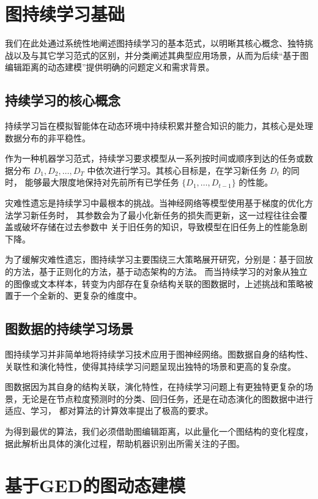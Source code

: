 \chapter{图持续学习基础}
我们在此处通过系统性地阐述图持续学习的基本范式，以明晰其核心概念、独特挑战以及与其它学习范式的区别，并分类阐述其典型应用场景，从而为后续“基于图编辑距离的动态建模”提供明确的问题定义和需求背景。

\section{持续学习的核心概念}

持续学习旨在模拟智能体在动态环境中持续积累并整合知识的能力，其核心是处理数据分布的非平稳性。

作为一种机器学习范式，持续学习要求模型从一系列按时间或顺序到达的任务或数据分布
$D_1,D_2,\dots,D_T$ 中依次进行学习。其核心目标是，在学习新任务 $D_t$ 的同时，
能够最大限度地保持对先前所有已学任务 $\{D_1,\dots,D_{t-1}\}$ 的性能。

灾难性遗忘是持续学习中最根本的挑战。当神经网络等模型使用基于梯度的优化方法学习新任务时，
其参数会为了最小化新任务的损失而更新，这一过程往往会覆盖或破坏存储在过去参数中
关于旧任务的知识，导致模型在旧任务上的性能急剧下降。

为了缓解灾难性遗忘，图持续学习主要围绕三大策略展开研究，分别是：基于回放的方法，基于正则化的方法，基于动态架构的方法。
而当持续学习的对象从独立的图像或文本样本，转变为内部存在复杂结构关联的图数据时，上述挑战和策略被置于一个全新的、更复杂的维度中。

\section{图数据的持续学习场景}

图持续学习并非简单地将持续学习技术应用于图神经网络。图数据自身的结构性、关联性和演化特性，使得其持续学习问题呈现出独特的场景和更高的复杂度。

图数据因为其自身的结构关联，演化特性，在持续学习问题上有更独特更复杂的场景，无论是在节点粒度预测时的分类、回归任务，还是在动态演化的图数据中进行适应、学习，
都对算法的计算效率提出了极高的要求。

为得到最优的算法，我们必须借助图编辑距离，以此量化一个图结构的变化程度，据此解析出具体的演化过程，帮助机器识别出所需关注的子图。

\chapter{基于GED的图动态建模}

